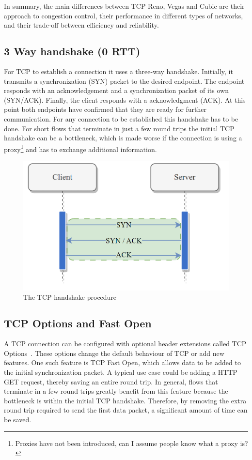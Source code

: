\documentclass[a4paper,english, 11pt]{report}
\begin{document}
In summary, the main differences between TCP Reno, Vegas and Cubic are their approach to congestion control, their performance in different types of networks, and their trade-off between efficiency and reliability.

\subsection{3 Way handshake (0 RTT)}
For TCP to establish a connection it uses a three-way handshake. Initially, it transmits a synchronization (SYN) packet to the desired endpoint. The endpoint responds with an acknowledgement and a synchronization packet of its own (SYN/ACK). Finally, the client responds with a acknowledgment (ACK). At this point both endpoints have confirmed that they are ready for further communication. For any connection to be established this handshake has to be done. For short flows that terminate in just a few round trips the initial TCP handshake can be a bottleneck, which is made worse if the connection is using a proxy\footnote{Proxies have not been introduced, can I assume people know what a proxy is?} and has to exchange additional information. 

\begin{figure} %
	\centering
	\includegraphics[scale=0.75]{../diagrams/drawio/tcphandshake.png}
  	\caption{The TCP handshake procedure}
  	\label{fig:tcphandshake}
\end{figure}

\subsection{TCP Options and Fast Open}
A TCP connection can be configured with optional header extensions called TCP Options~\cite{tcp_options}. These options change the default behaviour of TCP or add new features. One such feature is TCP Fast Open, which allows data to be added to the initial synchronization packet. A typical use case could be adding a HTTP GET request, thereby saving an entire round trip. In general, flows that terminate in a few round trips greatly benefit from this feature because the bottleneck is within the initial TCP handshake. Therefore, by removing the extra round trip required to send the first data packet, a significant amount of time can be saved.\\
\end{document}
